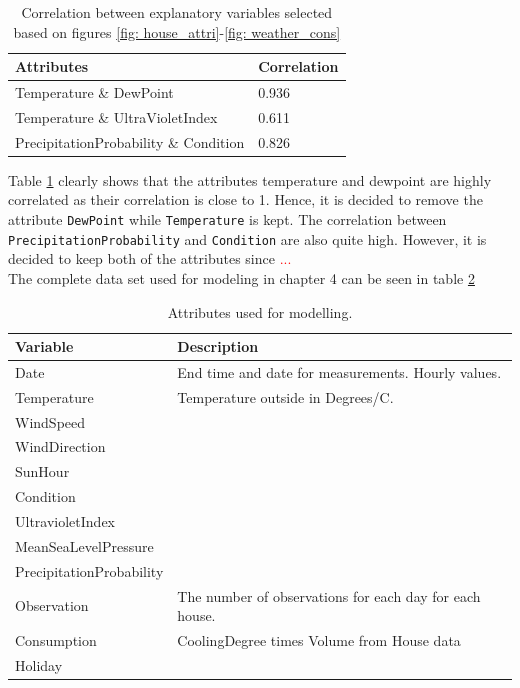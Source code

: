\noindent 


\begin{table}
    \centering
    \begin{tabular}{ll}
     \hline
     \textbf{Attributes} & \textbf{Correlation}  \\
    \hline
    \hline
    Temperature \& DewPoint  &  0.936 \\
    Temperature \& UltraVioletIndex  & 0.611 \\
    PrecipitationProbability \& Condition & 0.826 \\
    \hline
    \end{tabular}
    \caption{Correlation between explanatory variables selected based on figures \ref{fig: house_attri}-\ref{fig: weather_cons}}
    \label{tab: correlation_table}
\end{table}   
Table \ref{tab: correlation_table} clearly shows that the attributes temperature and dewpoint are highly correlated as their correlation is close to 1. Hence, it is decided to remove the attribute \texttt{DewPoint} while \texttt{Temperature} is kept. The correlation between \texttt{PrecipitationProbability} and \texttt{Condition} are also quite high. However, it is decided to keep both of the attributes since \textcolor{red}{...} \\



\noindent The complete data set used for modeling in chapter 4 can be seen in table \ref{tab: modeldata} 
\begin{table}
    \centering
    \begin{tabular}{ll}
     \hline
     \textbf{Variable} & \textbf{Description} \\
    \hline
    \hline
    Date  &  End time and date for measurements. Hourly values.\\
    Temperature  &  Temperature outside in Degrees/C. \\
    WindSpeed  &  \\
    WindDirection  &  \\
    SunHour  &  \\
    Condition  & \\
    UltravioletIndex  &   \\
    MeanSeaLevelPressure  & \\
    PrecipitationProbability & \\
    Observation & The number of observations for each day for each house.\\
    Consumption & CoolingDegree times Volume from House data \\
    Holiday & \\
    \hline
    \end{tabular}
    \caption{Attributes used for modelling.}
    \label{tab: modeldata}
\end{table}   